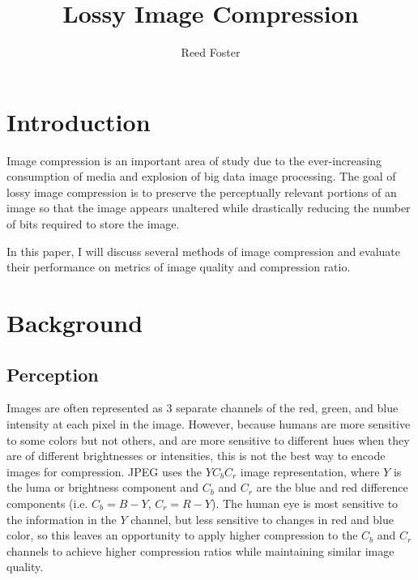 \documentclass[conference]{IEEEtran}
\begin{document}
\title{Lossy Image Compression}

\author{Reed Foster}

\maketitle

\begin{abstract}
\end{abstract}


\section{Introduction}

Image compression is an important area of study due to the ever-increasing consumption of media and explosion of big data image processing.
The goal of lossy image compression is to preserve the perceptually relevant portions of an image so that the image appears unaltered while drastically reducing the number of bits required to store the image.

In this paper, I will discuss several methods of image compression and evaluate their performance on metrics of image quality and compression ratio.

\section{Background}

\subsection{Perception}
Images are often represented as 3 separate channels of the red, green, and blue intensity at each pixel in the image.
However, because humans are more sensitive to some colors but not others, and are more sensitive to different hues when they are of different brightnesses or intensities, this is not the best way to encode images for compression.
JPEG uses the $YC_bC_r$ image representation, where $Y$ is the luma or brightness component and $C_b$ and $C_r$ are the blue and red difference components (i.e. $C_b = B - Y$, $C_r = R - Y$).
The human eye is most sensitive to the information in the $Y$ channel, but less sensitive to changes in red and blue color, so this leaves an opportunity to apply higher compression to the $C_b$ and $C_r$ channels to achieve higher compression ratios while maintaining similar image quality.
\end{document}
